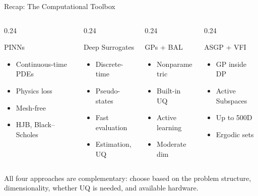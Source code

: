 \documentclass[aspectratio=169,11pt]{beamer}
\newcommand{\emphc}[1]{\textcolor{harvardcrimson}{#1}}
\begin{document}
\begin{frame}{Recap: The Computational Toolbox}
\small
\begin{columns}[T]
\begin{column}{0.24\textwidth}
\begin{block}{\small PINNs}
\scriptsize
\begin{itemize}\itemsep0pt
  \item Continuous-time PDEs
  \item Physics loss
  \item Mesh-free
  \item HJB, Black--Scholes
\end{itemize}
\end{block}
\end{column}
\begin{column}{0.24\textwidth}
\begin{block}{\small Deep Surrogates}
\scriptsize
\begin{itemize}\itemsep0pt
  \item Discrete-time
  \item Pseudo-states
  \item Fast evaluation
  \item Estimation, UQ
\end{itemize}
\end{block}
\end{column}
\begin{column}{0.24\textwidth}
\begin{block}{\small GPs + BAL}
\scriptsize
\begin{itemize}\itemsep0pt
  \item Nonparametric
  \item Built-in UQ
  \item Active learning
  \item Moderate dim
\end{itemize}
\end{block}
\end{column}
\begin{column}{0.24\textwidth}
\begin{block}{\small ASGP + VFI}
\scriptsize
\begin{itemize}\itemsep0pt
  \item GP inside DP
  \item Active Subspaces
  \item Up to 500D
  \item Ergodic sets
\end{itemize}
\end{block}
\end{column}
\end{columns}

\vspace{0.3cm}
All four approaches are \emphc{complementary}: choose based on the problem structure, dimensionality, whether UQ is needed, and available hardware.
\end{frame}
\end{document}
